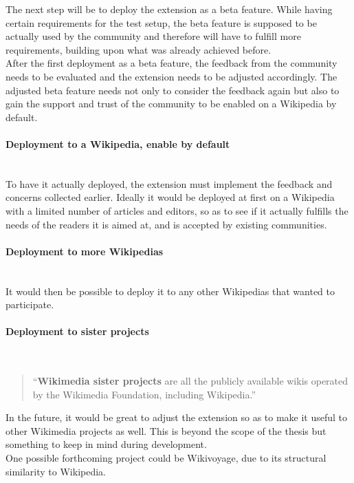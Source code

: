 The next step will be to deploy the extension as a beta feature. While having certain requirements for the test setup, the beta feature is supposed to be actually used by the community and therefore will have to fulfill more requirements, building upon what was already achieved before. \\
After the first deployment as a beta feature, the feedback from the community needs to be evaluated and the extension needs to be adjusted accordingly. The adjusted beta feature needs not only to consider the feedback again but also to gain the support and trust of the community to be enabled on a Wikipedia by default.

\paragraph{Deployment to a Wikipedia, enable by default} ~\\
To have it actually deployed, the extension must implement the feedback and concerns collected earlier. Ideally it would be deployed at first on a Wikipedia with a limited number of articles and editors, so as to see if it actually fulfills the needs of the readers it is aimed at, and is accepted by existing communities.

\paragraph{Deployment to more Wikipedias} ~\\
It would then be possible to deploy it to any other Wikipedias that wanted to participate.

\paragraph{Deployment to sister projects} ~\\
\begin{quote}
``\textbf{Wikimedia sister projects} are all the publicly available wikis operated by the Wikimedia Foundation, including Wikipedia.'' \citep{wiki:29}
\end{quote}

In the future, it would be great to adjust the extension so as to make it useful to other Wikimedia projects as well. This is beyond the scope of the thesis but something to keep in mind during development. \\
One possible forthcoming project could be Wikivoyage, due to its structural similarity to Wikipedia.